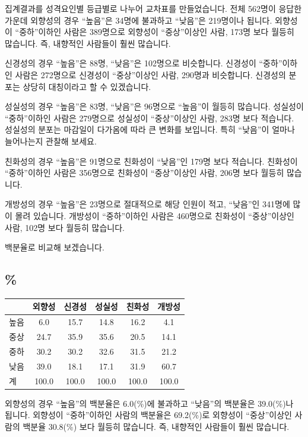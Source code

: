 \documentclass[
]{book}
\begin{document}
집계결과를 성격요인별 등급별로 나누어 교차표를 만들었습니다. 전체 562명이 응답한 가운데 외향성의 경우 ``높음''은 34명에 불과하고 ``낮음''은 219명이나 됩니다. 외향성이 ``중하''이하인 사람은 389명으로 외향성이 ``중상''이상인 사람, 173명 보다 월등히 많습니다. 즉, 내향적인 사람들이 훨씬 많습니다.

신경성의 경우 ``높음''은 88명, ``낮음''은 102명으로 비슷합니다. 신경성이 ``중하''이하인 사람은 272명으로 신경성이 ``중상''이상인 사람, 290명과 비슷합니다. 신경성의 분포는 상당히 대칭이라고 할 수 있겠습니다.

성실성의 경우 ``높음''은 83명, ``낮음''은 96명으로 ``높음''이 월등히 많습니다. 성실성이 ``중하''이하인 사람은 279명으로 성실성이 ``중상''이상인 사람, 283명 보다 적습니다. 성실성의 분포는 마감일이 다가옴에 따라 큰 변화를 보입니다. 특히 ``낮음''이 얼마나 늘어나는지 관찰해 보세요.

친화성의 경우 ``높음''은 91명으로 친화성이 ``낮음''인 179명 보다 적습니다. 친화성이 ``중하''이하인 사람은 356명으로 친화성이 ``중상''이상인 사람, 206명 보다 월등히 많습니다.

개방성의 경우 ``높음''은 23명으로 절대적으로 해당 인원이 적고, ``낮음''인 341명에 많이 몰려 있습니다. 개방성이 ``중하''이하인 사람은 460명으로 친화성이 ``중상''이상인 사람, 102명 보다 월등히 많습니다.

백분율로 비교해 보겠습니다.

\subsection{\%}\label{section-29}

\begin{tabular}{l|c|c|c|c|c}
\hline
  & 외향성 & 신경성 & 성실성 & 친화성 & 개방성\\
\hline
높음 & 6.0 & 15.7 & 14.8 & 16.2 & 4.1\\
\hline
중상 & 24.7 & 35.9 & 35.6 & 20.5 & 14.1\\
\hline
중하 & 30.2 & 30.2 & 32.6 & 31.5 & 21.2\\
\hline
낮음 & 39.0 & 18.1 & 17.1 & 31.9 & 60.7\\
\hline
계 & 100.0 & 100.0 & 100.0 & 100.0 & 100.0\\
\hline
\end{tabular}

외향성의 경우 ``높음''의 백분율은 6.0(\%)에 불과하고 ``낮음''의 백분율은 39.0(\%)나 됩니다. 외향성이 ``중하''이하인 사람의 백분율은 69.2(\%)로 외향성이 ``중상''이상인 사람의 백분율 30.8(\%) 보다 월등히 많습니다. 즉, 내향적인 사람들이 훨씬 많습니다.
\end{document}
